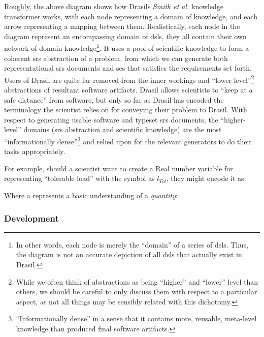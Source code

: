 \roughNetworkOfDomains{}

Roughly, the above diagram shows how Drasils \textit{Smith et al.} knowledge
transformer works, with each node representing a domain of knowledge, and each
arrow representing a mapping between them. Realistically, each node in the
diagram represent an encompassing domain of \acsp{dsl}, they all contain their
own network of domain knowledge\footnote{In other words, each node is merely the
      ``domain'' of a series of \acsp{dsl}. Thus, the diagram is not an accurate
      depiction of all \acsp{dsl} that actually exist in Drasil.}. It uses a pool of
scientific knowledge to form a coherent \acs{srs} abstraction of a problem, from
which we can generate both representational \acs{srs} documents and \acs{scs}
that satisfies the requirements set forth. Users of Drasil are quite far-removed
from the inner workings and ``lower-level''\footnote{While we often think of
      abstractions as being ``higher'' and ``lower'' level than others, we should be
      careful to only discuss them with respect to a particular aspect, as not all
      things may be sensibly related with this dichotomy.} abstractions of resultant
software artifacts. Drasil allows scientists to ``keep at a safe distance'' from
software, but only so far as Drasil has encoded the terminology the scientist
relies on for conveying their problem to Drasil. With respect to generating
usable software and typeset \acs{srs} documents, the ``higher-level'' domains
(\acs{srs} abstraction and scientific knowledge) are the most ``informationally
dense''\footnote{``Informationally dense'' in a sense that it contains more,
      reusable, meta-level knowledge than produced final software artifacts.} and
relied upon for the relevant generators to do their tasks appropriately.

For example, should a scientist want to create a Real number variable for
representing ``tolerable load'' with the symbol as $l_{Tol}$, they might encode
it as:

\originalQuantityDictExampleHaskell{}

Where a \QuantityDict{} represents a basic understanding of a \textit{quantity}:

\originalQuantityDictHaskell{}


\subsubsection{Development}

